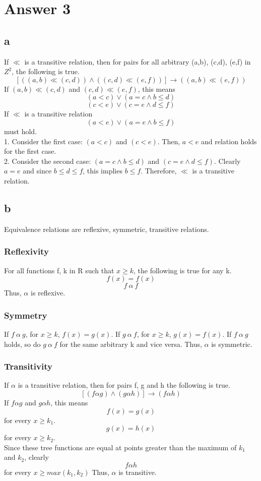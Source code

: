 \documentclass[12pt]{article}
\begin{document}
\section*{Answer 3}
\subsection*{a}
If $\ll$ is a transitive relation, then for pairs for all arbitrary (a,b), (c,d), (e,f) in $Z^2$, the following is true.
$$[((a,b)\ll (c,d)) \wedge ((c,d)\ll (e,f))]\rightarrow ((a,b)\ll (e,f))$$
If $(a,b)\ll (c,d)$ and $(c,d)\ll (e,f)$, this means
$$(a<c) \vee (a=c \wedge b\leq d)$$
$$(c<e) \vee (c=e \wedge d\leq f)$$
If $\ll$ is a transitive relation
$$(a<e) \vee (a=e \wedge b\leq f)$$
must hold.\\
1. Consider the first case: $(a<c)$ and $(c<e)$. Then, $a<e$ and relation holds for the first case.\\
2. Consider the second case: $(a=c \wedge b\leq d)$ and $(c=e \wedge d\leq f)$. Clearly $a=e$ and since $b\leq d \leq f$, this implies $b\leq f$.
Therefore, $\ll$ is a transitive relation.
\subsection*{b}
Equivalence relations are reflexive, symmetric, transitive relations.
\subsubsection*{Reflexivity}
For all functions f, k in R such that $x\geq k$, the following is true for any k.
$$f(x)=f(x)$$
$$f\ \alpha \ f$$
Thus, $\alpha$ is reflexive.
\subsubsection*{Symmetry}
If $f\ \alpha \ g$, for $x\geq k$, $f(x)=g(x)$. If $g\ \alpha \ f$, for $x\geq k$, $g(x)=f(x)$.
If $f\ \alpha \ g$ holds, so do $g\ \alpha \ f$ for the same arbitrary k and vice versa. Thus, $\alpha$ is symmetric.
\subsubsection*{Transitivity}
If $\alpha$ is a transitive relation, then for pairs f, g and h the following is true.
$$[(f\alpha g) \wedge (g\alpha h)]\rightarrow (f \alpha h)$$
If $f\alpha g$ and $g\alpha h$, this means
$$f(x)=g(x)$$ for every $x \geq k_1$.
$$g(x)= h(x)$$ for every $x \geq k_2$.\\
Since these tree functions are equal at points greater than the maximum of $k_1$ and $k_2$, clearly
$$f \alpha h$$ for every $x \geq max(k_1,k_2)$
Thus, $\alpha$ is transitive.
\end{document}
